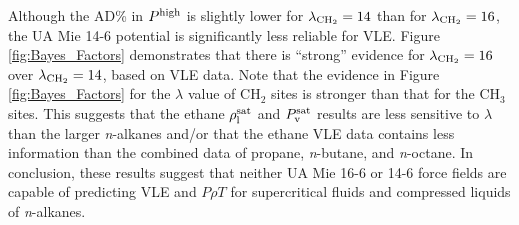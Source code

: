 \documentclass[preprint,letterpaper,floatfix,citeautoscript,aip,jcp]{revtex4-1}
\begin{document}
Although the AD\% in $P^{\rm high}$ is slightly lower for $\lambda_{\rm CH_2} = 14$ than for $\lambda_{\rm CH_2} = 16$, the UA Mie 14-6 potential is significantly less reliable for VLE. Figure \ref{fig:Bayes_Factors} demonstrates that there is ``strong'' evidence for $\lambda_{\rm CH_2} = 16$ over $\lambda_{\rm CH_2} = 14$, based on VLE data. 
Note that the evidence in Figure \ref{fig:Bayes_Factors} for the $\lambda$ value of CH$_2$ sites is stronger than that for the CH$_3$ sites. This suggests that the ethane $\rho_{\rm l}^{\rm sat}$ and $P_{\rm v}^{\rm sat}$ results are less sensitive to $\lambda$ than the larger \textit{n}-alkanes and/or that the ethane VLE data contains less information than the combined data of propane, \textit{n}-butane, and \textit{n}-octane.
In conclusion, these results suggest that neither UA Mie 16-6 or 14-6 force fields are capable of predicting VLE and $P \rho T$ for supercritical fluids and compressed liquids of \textit{n}-alkanes. 



\end{document}

